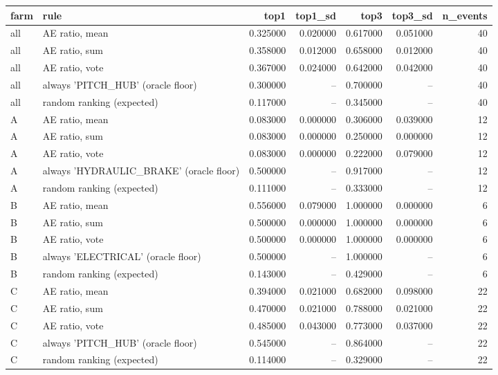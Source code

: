 \begin{tabular}{llrrrrr}
\toprule
farm & rule & top1 & top1_sd & top3 & top3_sd & n_events \\
\midrule
all & AE ratio, mean & 0.325000 & 0.020000 & 0.617000 & 0.051000 & 40 \\
all & AE ratio, sum & 0.358000 & 0.012000 & 0.658000 & 0.012000 & 40 \\
all & AE ratio, vote & 0.367000 & 0.024000 & 0.642000 & 0.042000 & 40 \\
all & always 'PITCH_HUB' (oracle floor) & 0.300000 & -- & 0.700000 & -- & 40 \\
all & random ranking (expected) & 0.117000 & -- & 0.345000 & -- & 40 \\
A & AE ratio, mean & 0.083000 & 0.000000 & 0.306000 & 0.039000 & 12 \\
A & AE ratio, sum & 0.083000 & 0.000000 & 0.250000 & 0.000000 & 12 \\
A & AE ratio, vote & 0.083000 & 0.000000 & 0.222000 & 0.079000 & 12 \\
A & always 'HYDRAULIC_BRAKE' (oracle floor) & 0.500000 & -- & 0.917000 & -- & 12 \\
A & random ranking (expected) & 0.111000 & -- & 0.333000 & -- & 12 \\
B & AE ratio, mean & 0.556000 & 0.079000 & 1.000000 & 0.000000 & 6 \\
B & AE ratio, sum & 0.500000 & 0.000000 & 1.000000 & 0.000000 & 6 \\
B & AE ratio, vote & 0.500000 & 0.000000 & 1.000000 & 0.000000 & 6 \\
B & always 'ELECTRICAL' (oracle floor) & 0.500000 & -- & 1.000000 & -- & 6 \\
B & random ranking (expected) & 0.143000 & -- & 0.429000 & -- & 6 \\
C & AE ratio, mean & 0.394000 & 0.021000 & 0.682000 & 0.098000 & 22 \\
C & AE ratio, sum & 0.470000 & 0.021000 & 0.788000 & 0.021000 & 22 \\
C & AE ratio, vote & 0.485000 & 0.043000 & 0.773000 & 0.037000 & 22 \\
C & always 'PITCH_HUB' (oracle floor) & 0.545000 & -- & 0.864000 & -- & 22 \\
C & random ranking (expected) & 0.114000 & -- & 0.329000 & -- & 22 \\
\bottomrule
\end{tabular}
